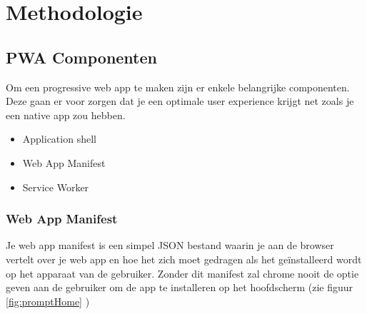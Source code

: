 
\chapter{Methodologie}
\label{ch:methodologie}


\section{PWA Componenten}
Om een progressive web app te maken zijn er enkele belangrijke componenten. Deze gaan er voor zorgen dat je een optimale user experience krijgt net zoals je een native app zou hebben.
\begin{itemize}  
	\item Application shell
	\item Web App Manifest
	\item Service Worker
\end{itemize}

\subsection{Web App Manifest}
Je web app manifest is een simpel JSON bestand waarin je aan de browser vertelt over je web app en hoe het zich moet gedragen als het geïnstalleerd wordt op het apparaat van de gebruiker. Zonder dit manifest zal chrome nooit de optie geven aan de gebruiker om de app te installeren op het hoofdscherm (zie figuur \ref{fig:promptHome} ) \\

